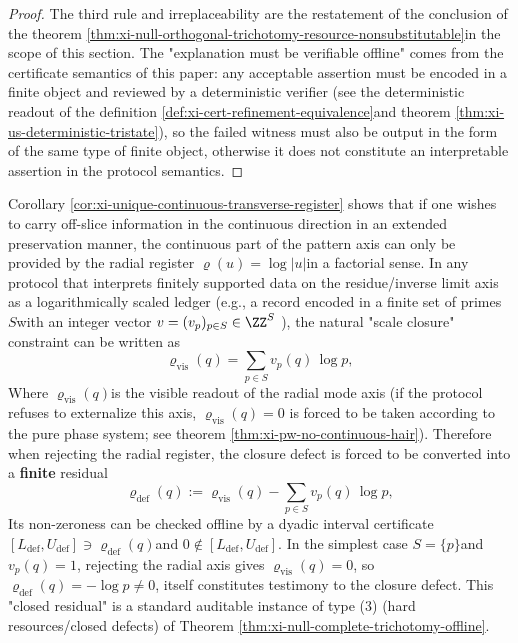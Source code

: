 \begin{proof}
The third rule and irreplaceability are the restatement of the conclusion of the theorem \ref{thm:xi-null-orthogonal-trichotomy-resource-nonsubstitutable} ​​in the scope of this section.
The "explanation must be verifiable offline" comes from the certificate semantics of this paper: any acceptable assertion must be encoded in a finite object and reviewed by a deterministic verifier (see the deterministic readout of the definition \ref{def:xi-cert-refinement-equivalence} ​​and theorem \ref{thm:xi-us-deterministic-tristate}), so the failed witness must also be output in the form of the same type of finite object, otherwise it does not constitute an interpretable assertion in the protocol semantics.
\end{proof}

\begin{remark}\label{rem:xi-null-closure-defect-finite-prime-witness}
Corollary \ref{cor:xi-unique-continuous-transverse-register} shows that if one wishes to carry off-slice information in the continuous direction in an extended preservation manner, the continuous part of the pattern axis can only be provided by the radial register \(\varrho(u)=\log|u|\) ​​in a factorial sense.
In any protocol that interprets finitely supported data on the residue/inverse limit axis as a logarithmically scaled ledger (e.g., a record encoded in a finite set of primes \(S\) ​​with an integer vector \(v=(v_p)_{p\in S}\in\ZZ^{S}\) ), the natural "scale closure" constraint can be written as
\[
\varrho_{\mathrm{vis}}(q)=\sum_{p\in S} v_p(q)\,\log p,
\]
Where \(\varrho_{\mathrm{vis}}(q)\) ​​is the visible readout of the radial mode axis (if the protocol refuses to externalize this axis, \(\varrho_{\mathrm{vis}}(q)=0\) is forced to be taken according to the pure phase system; see theorem \ref{thm:xi-pw-no-continuous-hair}).
Therefore when rejecting the radial register, the closure defect is forced to be converted into a \textbf{finite} residual
\[
\varrho_{\mathrm{def}}(q):=\varrho_{\mathrm{vis}}(q)-\sum_{p\in S} v_p(q)\,\log p,
\]
Its non-zeroness can be checked offline by a dyadic interval certificate \([L_{\mathrm{def}},U_{\mathrm{def}}]\ni \varrho_{\mathrm{def}}(q)\) ​​and \(0\notin [L_{\mathrm{def}},U_{\mathrm{def}}]\).
In the simplest case \(S=\{p\}\) ​​and \(v_p(q)=1\), rejecting the radial axis gives \(\varrho_{\mathrm{vis}}(q)=0\), so
\(
\varrho_{\mathrm{def}}(q)=-\log p\neq 0
\), itself constitutes testimony to the closure defect.
This "closed residual" is a standard auditable instance of type (3) (hard resources/closed defects) of Theorem \ref{thm:xi-null-complete-trichotomy-offline}.
\end{remark}

